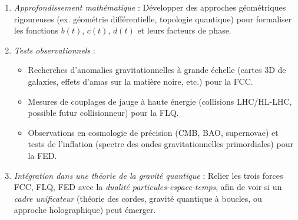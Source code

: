\documentclass[12pt]{article}
\begin{document}
\begin{enumerate}
    \item \emph{Approfondissement mathématique} : 
    Développer des approches géométriques rigoureuses (ex. géométrie différentielle, 
    topologie quantique) pour formaliser les fonctions $b(t)$, $c(t)$, $d(t)$ et 
    leurs facteurs de phase.
    
    \item \emph{Tests observationnels} : 
    \begin{itemize}
        \item Recherches d'anomalies gravitationnelles à grande échelle 
              (cartes 3D de galaxies, effets d'amas sur la matière noire, etc.) 
              pour la FCC.
        \item Mesures de couplages de jauge à haute énergie (collisions LHC/HL-LHC, 
              possible futur collisionneur) pour la FLQ.
        \item Observations en cosmologie de précision (CMB, BAO, supernovae) 
              et tests de l'inflation (spectre des ondes gravitationnelles primordiales) 
              pour la FED.
    \end{itemize}
    
    \item \emph{Intégration dans une théorie de la gravité quantique} : 
    Relier les trois forces FCC, FLQ, FED avec la \emph{dualité particules-espace-temps}, 
    afin de voir si un \emph{cadre unificateur} (théorie des cordes, gravité quantique à boucles, 
    ou approche holographique) peut émerger.
\end{enumerate}
\end{document}
